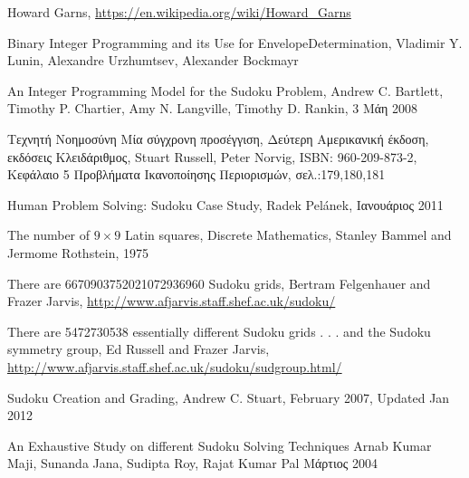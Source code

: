 \documentclass[12pt]{book}
\theoremstyle{definition}
\begin{document}
\begin{thebibliography}{99}
	Howard Garns, 
	\url{https://en.wikipedia.org/wiki/Howard_Garns} 
	
	Binary Integer Programming and its Use for EnvelopeDetermination,
	Vladimir Y. Lunin, Alexandre Urzhumtsev, Alexander Bockmayr 
	
	An Integer Programming Model for the Sudoku Problem,
	Andrew C. Bartlett,	Timothy P. Chartier, Amy N. Langville, Timothy D. Rankin,
	3 Μάη 2008 
	
	Τεχνητή Νοημοσύνη Μία σύγχρονη προσέγγιση, Δεύτερη Αμερικανική έκδοση, εκδόσεις Κλειδάριθμος,
	Stuart Russell, Peter Norvig,
	ISBN: 960-209-873-2,
	Κεφάλαιο 5 Προβλήματα Ικανοποίησης Περιορισμών, σελ.:179,180,181 
	
	Human Problem Solving: Sudoku Case Study,
	Radek Pelánek,
	Ιανουάριος 2011 

	The number of \(9 \times 9\) Latin squares, Discrete Mathematics,
	Stanley Bammel and Jermome Rothstein,
	1975 

	There are 6670903752021072936960 Sudoku grids,
	Bertram Felgenhauer and Frazer Jarvis,
	\url{ http://www.afjarvis.staff.shef.ac.uk/sudoku/} 

	There are 5472730538 essentially different Sudoku grids . . . and the
	Sudoku symmetry group,
	Ed Russell and Frazer Jarvis,
	\url{ http://www.afjarvis.staff.shef.ac.uk/sudoku/sudgroup.html/} 

	Sudoku Creation and Grading,
	Andrew C. Stuart,
	February 2007, Updated Jan 2012

	An Exhaustive Study on different Sudoku Solving
Techniques
	Arnab Kumar Maji, Sunanda Jana, Sudipta Roy, Rajat Kumar Pal 
	Μάρτιος 2004 

\end{thebibliography}
\end{document}
